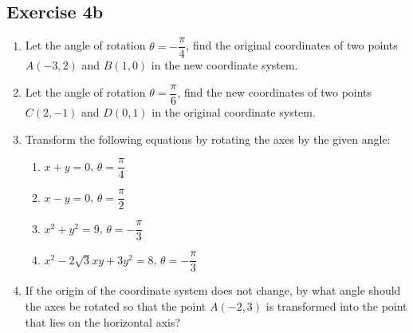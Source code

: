 \documentclass{report}
\begin{document}
\subsection*{Exercise 4b}
\begin{enumerate}[leftmargin=*]
    \item Let the angle of rotation $\theta = -\dfrac{\pi}{4}$, find the original
          coordinates of two points $A(-3, 2)$ and $B(1, 0)$ in the new coordinate
          system.
    \item Let the angle of rotation $\theta = \dfrac{\pi}{6}$, find the new coordinates
          of two points $C(2, -1)$ and $D(0, 1)$ in the original coordinate system.
    \item Transform the following equations by rotating the axes by the given angle:
          \begin{enumerate}
              \item $x + y = 0$, \qquad\qquad\qquad\hspace{1.4em} $\theta = \dfrac{\pi}{4}$
              \item $x - y = 0$, \qquad\qquad\qquad\hspace{1.4em} $\theta = \dfrac{\pi}{2}$
              \item $x^2 + y^2 = 9$, \qquad\qquad\qquad\hspace{0.7em}$\theta = -\dfrac{\pi}{3}$
              \item $x^2 - 2\sqrt{3}xy + 3y^2 = 8$, \qquad $\theta = -\dfrac{\pi}{3}$
          \end{enumerate}
    \item If the origin of the coordinate system does not change, by what angle should
          the axes be rotated so that the point $A(-2, 3)$ is transformed into the point
          that lies on the horizontal axis?
\end{enumerate}

\newpage
\end{document}
